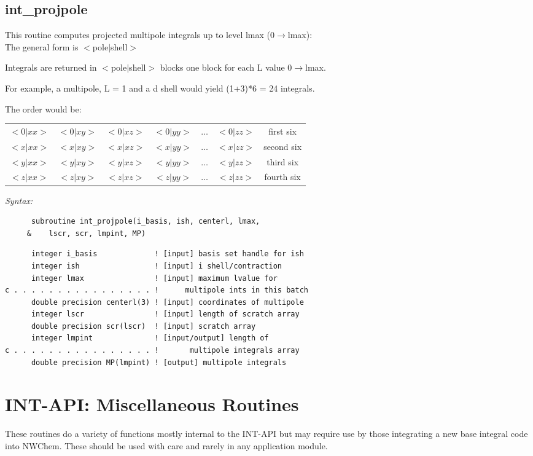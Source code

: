 \subsection{int\_projpole} 
This routine computes projected multipole integrals up to level  
lmax (0$\rightarrow$lmax):\\ 
The general form is $<$pole$|$shell$>$ 
  
Integrals are returned in $<$pole$|$shell$>$ blocks one block for each  
L value 0$\rightarrow$lmax.  
 
For example, a multipole, L = 1 and a d shell  
would yield (1+3)*6 = 24 integrals. 
 
The order would be:\\ 
\begin{tabular}{ccccccc} 
$<0|xx>$ & $<0|xy>$ & $<0|xz>$ & $<0|yy>$ & $\ldots$ & $<0|zz>$ & first six\\ 
$<x|xx>$ & $<x|xy>$ & $<x|xz>$ & $<x|yy>$ & $\ldots$ & $<x|zz>$ & second six\\ 
$<y|xx>$ & $<y|xy>$ & $<y|xz>$ & $<y|yy>$ & $\ldots$ & $<y|zz>$ & third six \\ 
$<z|xx>$ & $<z|xy>$ & $<z|xz>$ & $<z|yy>$ & $\ldots$ & $<z|zz>$ & fourth six 
\end{tabular} 
 
{\it Syntax:} 
\begin{verbatim} 
      subroutine int_projpole(i_basis, ish, centerl, lmax,  
     &    lscr, scr, lmpint, MP) 
\end{verbatim} 
\begin{verbatim} 
      integer i_basis             ! [input] basis set handle for ish 
      integer ish                 ! [input] i shell/contraction 
      integer lmax                ! [input] maximum lvalue for  
c . . . . . . . . . . . . . . . . !      multipole ints in this batch 
      double precision centerl(3) ! [input] coordinates of multipole 
      integer lscr                ! [input] length of scratch array 
      double precision scr(lscr)  ! [input] scratch array 
      integer lmpint              ! [input/output] length of  
c . . . . . . . . . . . . . . . . !       multipole integrals array 
      double precision MP(lmpint) ! [output] multipole integrals 
\end{verbatim} 
\section{INT-API: Miscellaneous Routines} 
These routines do a variety of functions mostly internal to the 
INT-API but may require use by those integrating a new base integral 
code into NWChem.  These should be used with care and rarely in any 
application module.  
% 
 
